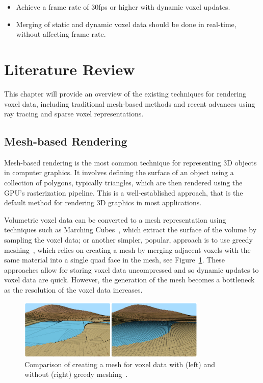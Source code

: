 \documentclass{article}
\begin{document}
\begin{itemize}
    \item Achieve a frame rate of 30fps or higher with dynamic voxel updates.
    \item Merging of static and dynamic voxel data should be done in real-time, without affecting frame rate.
\end{itemize}

\section{Literature Review}
This chapter will provide an overview of the existing techniques for rendering voxel data, including traditional mesh-based methods and recent advances using ray tracing and sparse voxel representations.

\subsection{Mesh-based Rendering}
Mesh-based rendering is the most common technique for representing 3D objects in computer graphics. It involves defining the surface of an object using a collection of polygons, typically triangles, which are then rendered using the GPU's rasterization pipeline. This is a well-established approach, that is the default method for rendering 3D graphics in most applications.

Volumetric voxel data can be converted to a mesh representation using techniques such as Marching Cubes~\cite{Amran_1998}, which extract the surface of the volume by sampling the voxel data; or another simpler, popular, approach is to use greedy meshing~\cite{mikolalysenko_2012}, which relies on creating a mesh by merging adjacent voxels with the same material into a single quad face in the mesh, see Figure~\ref{fig:greedy}. These approaches allow for storing voxel data uncompressed and so dynamic updates to voxel data are quick. However, the generation of the mesh becomes a bottleneck as the resolution of the voxel data increases.

\begin{figure}[thp]
    \begin{center}
        \includegraphics[width=0.8\textwidth]{figures/greedy.png}
    \end{center}
    \caption{Comparison of creating a mesh for voxel data with (left) and without (right) greedy meshing~\cite{Gedge_2014}.}
    \label{fig:greedy}
\end{figure}
\end{document}
